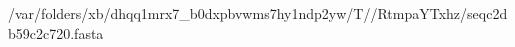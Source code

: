 \documentclass[10pt]{article}
\begin{document}
\begin{texshade}{/var/folders/xb/dhqq1mrx7_b0dxpbvwms7hy1ndp2yw/T//RtmpaYTxhz/seqc2db59c2c720.fasta}
\hideconsensus
{}
\hidelogoscale
{}
\showlegend
\end{texshade}
\end{document}
